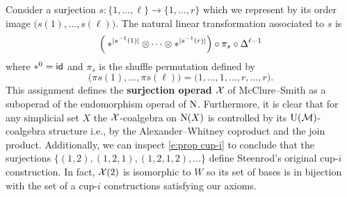 Consider a surjection $s \colon \{1, \dots, \ell\} \to \{1, \dots, r\}$ which we represent by its order image $\big( s(1), \dots, s(\ell) \big)$.
The natural linear transformation associated to $s$ is
\begin{equation} \label{e:surjection action}
\Big( \ast^{\lvert s^{-1}(1)\rvert} \otimes \dotsb \otimes \ast^{\lvert s^{-1}(r)\rvert} \Big) \circ \pi_s \circ \Delta^{\ell-1}
\end{equation}
where $\ast^0 = \mathsf{id}$ and $\pi_s$ is the shuffle permutation defined by
\[
\big( \pi s(1), \dots, \pi s(\ell) \big) =
\big( 1, \dots, 1, \dots, r, \dots, r \big).
\]
This assignment defines the \textbf{surjection operad} $\mathcal{X}$ of McClure--Smith \cite{mcclure2003multivariable} as a suboperad of the endomorphism operad of $\operatorname{N}$.
Furthermore, it is clear that for any simplicial set $X$ the $\mathcal{X}$-coalgebra on $\operatorname{N}(X)$ is controlled by its $\operatorname{U}(\operatorname{\mathcal{M}})$-coalgebra structure i.e., by the Alexander--Whitney coproduct and the join product.
Additionally, we can inspect \cref{e:prop cup-i} to conclude that the surjections $\big\{ (1,2), (1,2,1), (1,2,1,2), \dots \big\}$ define Steenrod's original \mbox{cup-$i$} construction.
In fact, $\mathcal{X}(2)$ is isomorphic to $W$ so its set of bases is in bijection with the set of a \mbox{cup-$i$} constructions satisfying our axioms.

\subsubsection{}

